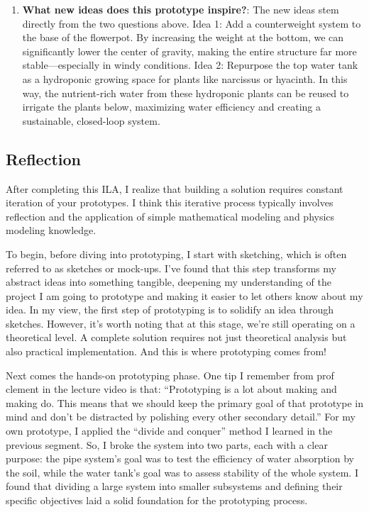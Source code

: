 \documentclass[math,code]{amznotes}
\theoremstyle{remark}
\begin{document}
\begin{enumerate}
    \item \textbf{What new ideas does this prototype inspire?}: The new ideas stem directly from the two questions above. Idea 1: Add a counterweight system to the base of the flowerpot. By increasing the weight at the bottom, we can significantly lower the center of gravity, making the entire structure far more stable—especially in windy conditions. Idea 2: Repurpose the top water tank as a hydroponic growing space for plants like narcissus or hyacinth. In this way, the nutrient-rich water from these hydroponic plants can be reused to irrigate the plants below, maximizing water efficiency and creating a sustainable, closed-loop system.
\end{enumerate}

\subsection{Reflection}
After completing this ILA, I realize that building a solution requires constant iteration of your prototypes. I think this iterative process typically involves reflection and the application of simple mathematical modeling and physics modeling knowledge.

To begin, before diving into prototyping, I start with sketching, which is often referred to as sketches or mock-ups. I’ve found that this step transforms my abstract ideas into something tangible, deepening my understanding of the project I am going to prototype and making it easier to let others know about my idea. In my view, the first step of prototyping is to solidify an idea through sketches. However, it’s worth noting that at this stage, we’re still operating on a theoretical level. A complete solution requires not just theoretical analysis but also practical implementation. And this is where prototyping comes from!

Next comes the hands-on prototyping phase. One tip I remember from prof clement in the lecture video is that: ``Prototyping is a lot about making and making do. This means that we should keep the primary goal of that prototype in mind and don’t be distracted by polishing every other secondary detail.'' For my own prototype, I applied the “divide and conquer” method I learned in the previous segment. So, I broke the system into two parts, each with a clear purpose: the pipe system’s goal was to test the efficiency of water absorption by the soil, while the water tank’s goal was to assess stability of the whole system. I found that dividing a large system into smaller subsystems and defining their specific objectives laid a solid foundation for the prototyping process.
\end{document}
